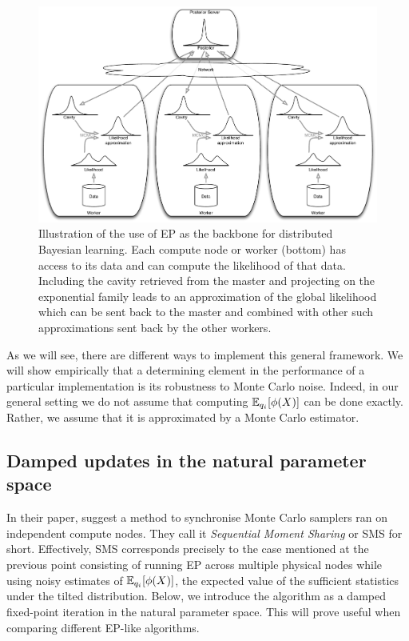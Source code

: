 \begin{figure}[!h]
	\center
	\includegraphics[width=\textwidth]{figures/snep/PosteriorServer}
	\caption{\label{fig:SNEP-arch} Illustration of the use of EP as the backbone for distributed Bayesian learning. Each compute node or worker (bottom) has access to its data and can compute the likelihood of that data. Including the cavity retrieved from the master and projecting on the exponential family leads to an approximation of the global likelihood which can be sent back to the master and combined with other such approximations sent back by the other workers.}
\end{figure}

As we will see, there are different ways to implement this general framework.
We will show empirically that a determining element in the performance of a particular implementation is its robustness to Monte Carlo noise. 
Indeed, in our general setting we do not assume that computing $\mathbb E_{q_i}[\phi(X)]$ can be done exactly. Rather, we assume that it is approximated by a Monte Carlo estimator.
\subsection{Damped updates in the natural parameter space}
In their paper, \citet{xu14} suggest a method to synchronise Monte Carlo samplers ran on independent compute nodes. They call it \emph{Sequential Moment Sharing} or SMS for short. Effectively, SMS corresponds precisely to the case mentioned at the previous point consisting of running EP across multiple physical nodes while using noisy estimates of $\mathbb E_{q_i}[\phi(X)]$, the expected value of the sufficient statistics under the tilted distribution. 
Below, we introduce the algorithm as a damped fixed-point iteration in the natural parameter space. This will prove useful when comparing different EP-like algorithms.

